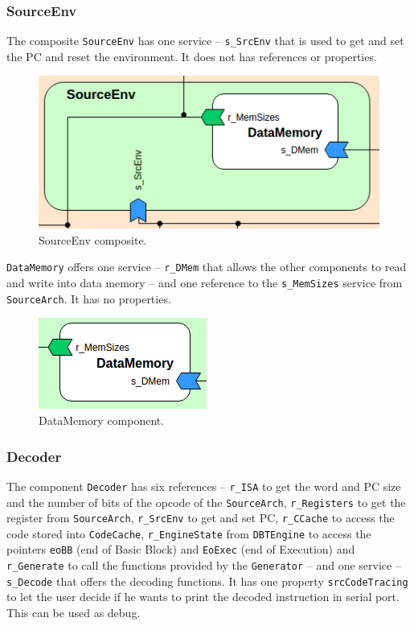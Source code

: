 \documentclass{report}
\newcounter{subsubsubsection}[subsubsection]
\begin{document}
			\subsubsection{SourceEnv}
			
			\par The composite \texttt{SourceEnv} has one service -- \texttt{s\_SrcEnv} that is used to get and set the PC and reset the environment. It does not has references or properties.
			
			\begin{figure} [H]
				\centering
				\includegraphics[width=0.5\linewidth]{Images/arch-ref/SourceEnv}
				\caption{SourceEnv composite.}
				\label{fig:SourceEnv}
			\end{figure}
		
				
				\par \texttt{DataMemory} offers one service -- \texttt{r\_DMem} that allows the other components to read and write into data memory -- and one reference to the \texttt{s\_MemSizes} service from \texttt{SourceArch}. It has no properties.
		
				\begin{figure} [H]
					\centering
					\includegraphics[width=0.3\linewidth]{Images/arch-ref/DataMemory}
					\caption{DataMemory component.}
					\label{fig:DataMemory}
				\end{figure}
		
			\subsubsection{Decoder}
			
			\par The component \texttt{Decoder} has six references -- \texttt{r\_ISA} to get the word and PC size and the number of bits of the opcode of the \texttt{SourceArch}, \texttt{r\_Registers} to get the register from \texttt{SourceArch}, \texttt{r\_SrcEnv} to get and set PC, \texttt{r\_CCache} to access the code stored into \texttt{CodeCache}, \texttt{r\_EngineState} from \texttt{DBTEngine} to access the pointers \texttt{eoBB} (end of Basic Block) and \texttt{EoExec} (end of Execution) and \texttt{r\_Generate} to call the functions provided by the \texttt{Generator} -- and one service -- \texttt{s\_Decode} that offers the decoding functions. It has one property \texttt{srcCodeTracing} to let the user decide if he wants to print the decoded instruction in serial port. This can be used as debug. 
			
\end{document}
